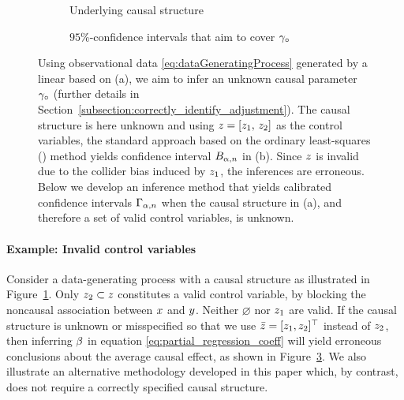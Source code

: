 \begin{figure*}[ht!]
     \centering
     \begin{subfigure}[b]{0.45\textwidth}
         \centering
         \tikzset{node distance=2.3cm}
         
         \caption{Underlying causal structure}
         \label{fig:collider_dag}
     \end{subfigure}
     \hfill
     \begin{subfigure}[b]{0.45\textwidth}
         \centering
         
         \caption{$95\%$-confidence intervals that aim to cover $\gamma_\circ$}
         \label{fig:collider_asymptotics}
     \end{subfigure}
     \hfill
     \caption{Using observational data \eqref{eq:dataGeneratingProcess} generated by a linear \scm{} based on (a), we aim to infer an unknown causal parameter $\gamma_\circ$ (further details in Section~\ref{subsection:correctly_identify_adjustment}).
     The causal structure is here unknown and using $z=[z_1 ,\, z_2]$ as the control variables, the standard approach based on the ordinary least-squares (\OLS) method yields confidence interval $B_{\alpha,n}$ in (b). Since $z$ is invalid
     due to the collider bias induced by $z_1$, the inferences are erroneous.
     Below we develop an inference method that yields calibrated confidence intervals $\Gamma_{\alpha,n}$ when the causal structure in (a), and therefore a set of valid control variables, is unknown.}
\end{figure*}

\paragraph{Example: Invalid control variables} 
Consider a data-generating process with a causal structure as illustrated in Figure~\ref{fig:collider_dag}. Only $z_2 \subset z$ constitutes  a valid control variable, by blocking the noncausal association between $x$ and $y$. Neither $\varnothing$ nor $z_1$ are valid. If the causal structure is unknown or misspecified so that we use $\bar{z} = [z_1, z_2]^\top$ instead of $z_2$, then inferring $\beta$ in equation \eqref{eq:partial_regression_coeff} will yield erroneous conclusions about the average causal effect, as shown in Figure~\ref{fig:collider_asymptotics}. We also illustrate an alternative methodology developed in this paper which, by contrast, does not require a correctly specified causal structure.

